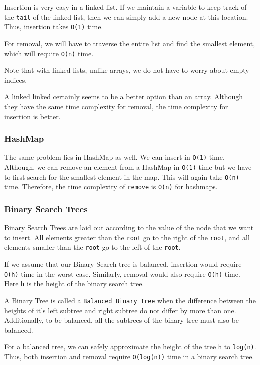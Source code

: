 \documentclass[11pt]{article}
\begin{document}
Insertion is very easy in a linked list. If we maintain a variable to
keep track of the \texttt{tail} of the linked list, then we can simply
add a new node at this location. Thus, insertion takes \texttt{O(1)}
time.

For removal, we will have to traverse the entire list and find the
smallest element, which will require \texttt{O(n)} time.

Note that with linked lists, unlike arrays, we do not have to worry
about empty indices.

A linked linked certainly seems to be a better option than an array.
Although they have the same time complexity for removal, the time
complexity for insertion is better.

    \subsubsection{HashMap}\label{hashmap}

The same problem lies in HashMap as well. We can insert in \texttt{O(1)}
time. Although, we can remove an element from a HashMap in \texttt{O(1)}
time but we have to first search for the smallest element in the map.
This will again take \texttt{O(n)} time. Therefore, the time complexity
of \texttt{remove} is \texttt{O(n)} for hashmaps.

    \subsubsection{Binary Search Trees}\label{binary-search-trees}

Binary Search Trees are laid out according to the value of the node that
we want to insert. All elements greater than the \texttt{root} go to the
right of the \texttt{root}, and all elements smaller than the
\texttt{root} go to the left of the \texttt{root}.

If we assume that our Binary Search tree is balanced, insertion would
require \texttt{O(h)} time in the worst case. Similarly, removal would
also require \texttt{O(h)} time. Here \texttt{h} is the height of the
binary search tree.

A Binary Tree is called a \texttt{Balanced\ Binary\ Tree} when the
difference between the heights of it's left subtree and right subtree do
not differ by more than one. Additionally, to be balanced, all the
subtrees of the binary tree must also be balanced.

For a balanced tree, we can safely approximate the height of the tree
\texttt{h} to \texttt{log(n)}. Thus, both insertion and removal require
\texttt{O(log(n))} time in a binary search tree.
\end{document}
